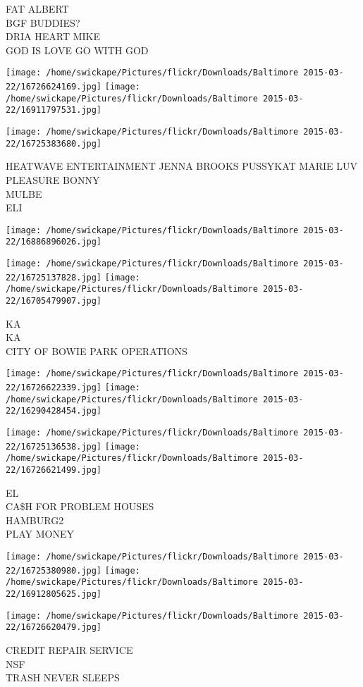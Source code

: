 \documentclass[10pt,letterpaper]{article}
\begin{document}
FAT ALBERT\\
BGF BUDDIES?\\
DRIA HEART MIKE\\
GOD IS LOVE GO WITH GOD\\
\pagebreak

\texttt{[image: /home/swickape/Pictures/flickr/Downloads/Baltimore 2015-03-22/16726624169.jpg]}
\texttt{[image: /home/swickape/Pictures/flickr/Downloads/Baltimore 2015-03-22/16911797531.jpg]}

\texttt{[image: /home/swickape/Pictures/flickr/Downloads/Baltimore 2015-03-22/16725383680.jpg]}

HEATWAVE ENTERTAINMENT JENNA BROOKS PUSSYKAT MARIE LUV PLEASURE BONNY\\
MULBE\\
ELI\\
\pagebreak

\texttt{[image: /home/swickape/Pictures/flickr/Downloads/Baltimore 2015-03-22/16886896026.jpg]}

\vspace{0.25in}
\texttt{[image: /home/swickape/Pictures/flickr/Downloads/Baltimore 2015-03-22/16725137828.jpg]}
\texttt{[image: /home/swickape/Pictures/flickr/Downloads/Baltimore 2015-03-22/16705479907.jpg]}

KA\\
KA\\
CITY OF BOWIE PARK OPERATIONS\\
\pagebreak

\texttt{[image: /home/swickape/Pictures/flickr/Downloads/Baltimore 2015-03-22/16726622339.jpg]}
\texttt{[image: /home/swickape/Pictures/flickr/Downloads/Baltimore 2015-03-22/16290428454.jpg]}

\texttt{[image: /home/swickape/Pictures/flickr/Downloads/Baltimore 2015-03-22/16725136538.jpg]}
\texttt{[image: /home/swickape/Pictures/flickr/Downloads/Baltimore 2015-03-22/16726621499.jpg]}

EL\\
CA\$H FOR PROBLEM HOUSES\\
HAMBURG2\\
PLAY MONEY\\
\pagebreak

\texttt{[image: /home/swickape/Pictures/flickr/Downloads/Baltimore 2015-03-22/16725380980.jpg]}
\texttt{[image: /home/swickape/Pictures/flickr/Downloads/Baltimore 2015-03-22/16912805625.jpg]}

\vspace{0.25in}
\texttt{[image: /home/swickape/Pictures/flickr/Downloads/Baltimore 2015-03-22/16726620479.jpg]}

CREDIT REPAIR SERVICE\\
NSF\\
TRASH NEVER SLEEPS\\
\pagebreak
\end{document}
